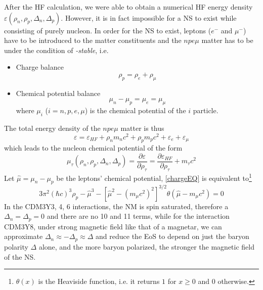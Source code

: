 After the \gls{HF} calculation, we were able to obtain a numerical \gls{HF} energy density $\varepsilon(\rho_n,\rho_p,\Delta_n,\Delta_p)$. However, it is in fact impossible for a \gls{NS} to exist while consisting of purely nucleon. In order for the \gls{NS} to exist, leptons ($e^-$ and $\mu^-$) have to be introduced to the matter constituents and the $npe\mu$ matter has to be under the condition of \emph{\textbeta-stable}, i.e.
\begin{itemize}
        \item Charge balance
                \begin{equation}
                        \rho_p = \rho_e + \rho_\mu
                        \label{chargeEQ}
                \end{equation}
        \item Chemical potential balance
                \begin{equation}
                        \mu_n - \mu_p = \mu_e = \mu_\mu
                \end{equation}
                where $\mu_i$ ($i=n,p,e,\mu$) is the chemical potential of the $i$ particle.
\end{itemize}
The total energy density of the $npe\mu$ matter is thus
\begin{equation}
        \varepsilon = \varepsilon_{HF} + \rho_n m_n c^2 + \rho_p m_p c^2 + \varepsilon_e + \varepsilon_\mu 
\end{equation}
which leads to the nucleon chemical potential of the form
\begin{equation}
        \mu_\tau (\rho_n,\rho_p,\Delta_n,\Delta_p) = \frac{\partial \varepsilon}{\partial \rho_\tau}  = \frac{\partial \varepsilon_{HF}}{\partial \rho_\tau} + m_\tau c^2
\end{equation}
Let $\hat{\mu} = \mu_n - \mu_p$ be the leptons' chemical potential, \eqref{chargeEQ} is equivalent to\footnote{$\theta(x)$ is the Heaviside function, i.e. it returns $1$ for $x\geq 0$ and $0$ otherwise.}
\begin{equation}
        3\pi^2 (\hbar c)^3 \rho_p - \hat{\mu}^3 - \left[ \hat{\mu}^2 - (m_\mu c^2)^2 \right]^{3/2} \theta(\hat{\mu} - m_\mu c^2) = 0
\end{equation}
In the CDM3Y3, 4, 6 interactions, the \gls{NM} is spin saturated, therefore a $\Delta_n = \Delta_p = 0$ and there are no 10 and 11 terms, while for the interaction CDM3Y8, under strong magnetic field like that of a magnetar, we can approximate $\Delta_n \approx -\Delta_p \approx \Delta$ and reduce the \gls{EoS} to depend on just the baryon polarity $\Delta$ alone, and the more baryon polarized, the stronger the magnetic field of the \gls{NS}.\par
